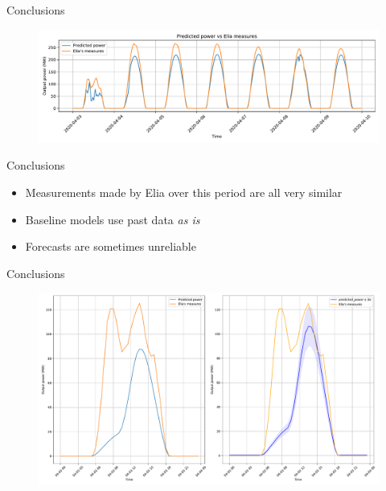 \documentclass[12pt]{beamer}
\begin{document}
\begin{frame}{Conclusions}
    \begin{figure}
    \centering
    \includegraphics[width=\textwidth]{resources/pdf/province_naive_03-04-2020.pdf}
    \label{fig:prior_model}
\end{figure}
\end{frame}

\begin{frame}{Conclusions}
    \begin{itemize}
        \item \alert{Measurements} made by Elia over this period are all very \alert{similar}
        \item Baseline models \alert{use} past data \emph{as is}
        \item \alert{Forecasts} are sometimes \alert{unreliable}
    \end{itemize}
\end{frame}

\begin{frame}{Conclusions}
    \begin{figure}[H]
    \centering
    \includegraphics[width=\textwidth]{resources/pdf/comparison_naive_posterior_27-03-2020.pdf}
    \label{fig:naive_posterior_3_april}
\end{figure}
\end{frame}
\end{document}

